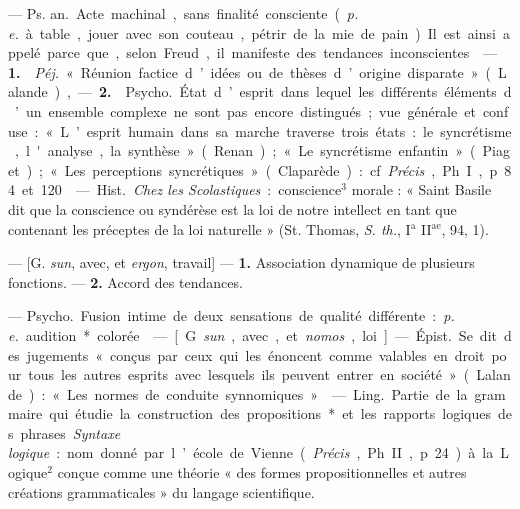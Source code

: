 \begin{itemize}[leftmargin=1cm, label=, itemsep=1pt]
 — \si{Ps. an.} Acte machinal, sans finalité
consciente ({\it p. e.} à table, jouer avec son couteau, pétrir de la mie de
pain). Il est ainsi appelé parce que, selon Freud, il manifeste des
tendances inconscientes.

 — {\bf 1.}  {\it Péj.} « Réunion factice
d’idées ou de thèses d’origine disparate » (Lalande), — {\bf 2.}
 \si{Psycho.} État d’esprit dans lequel les différents
éléments d’un ensemble complexe ne sont pas encore distingués; vue générale
et confuse : « L’esprit humain dans sa marche traverse trois états : le
syncrétisme, l'analyse, la synthèse » (Renan) ;
« Le syncrétisme enfantin » (Piaget) ; « Les perceptions syncrétiques
» (Claparède) : cf. {\it Précis}, Ph. I, p. 84 et 120.

 — \si{Hist.} {\it Chez les Scolastiques} : conscience$^3$
morale : « Saint Basile dit que la conscience ou syndérèse est la loi de
notre intellect en tant que contenant les préceptes de la loi naturelle
» (St. Thomas, {\it S. th.}, I$^\text{a}$ II$^\text{ae}$, 94, 1).

 — [G. {\it sun}, avec, et {\it ergon}, travail] — {\bf 1.}
Association dynamique de plusieurs fonctions. — {\bf 2.} Accord des
tendances.

 — \si{Psycho.} Fusion intime
de deux sensations de qualité différente : {\it p. e.} audition* colorée.

 — [G. {\it sun}, avec, et {\it nomos}, loi] — \si{Épist.} Se
dit des jugements « conçus par ceux qui les énoncent comme valables en droit
pour tous les autres esprits avec lesquels ils peuvent entrer en société
» (Lalande) : « Les normes de conduite synnomiques. »

 — \si{Ling.} Partie de la grammaire qui étudie la construction
des propositions* et les rapports logiques des phrases. {\it Syntaxe
logique} : nom donné par l’école de Vienne ({\it Précis}, Ph. II, p. 24) à la
Logique$^2$ conçue comme une théorie « des formes propositionnelles et autres
créations grammaticales » du langage scientifique.


\end{itemize}
